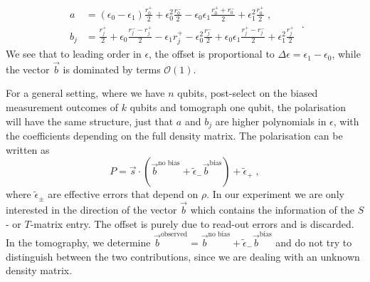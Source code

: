 \documentclass[a4paper,twocolumn,11pt]{quantumarticle}
\begin{document}
\begin{equation}
\begin{aligned}
	a&=(\epsilon_0-\epsilon_1) \frac{r^+_0}{2} +\epsilon_0^2 \frac{r^-_0}{2} -\epsilon_0 \epsilon_1 \frac{r^+_0+r^-_0}{2} +\epsilon_1^2 \frac{r_0^+}{2}\;,\\
	b_j&=\frac{r^+_j}{2}+ \epsilon_0 \frac{r^-_j-r^+_j}{2} -\epsilon_1 r^+_j -\epsilon_0^2 \frac{r^-_j}{2} +\epsilon_0 \epsilon_1 \frac{r^+_j-r^-_j}{2} + \epsilon_1^2 \frac{r_j^+}{2}
	\end{aligned}\;.
\end{equation}
We see that to leading order in $\epsilon$, the offset is proportional to $\Delta \epsilon=\epsilon_1-\epsilon_0$, while the vector $\vec b$ is dominated by terms $\mathcal O(1)$.

For a general setting, where we have $n$ qubits, post-select on the biased measurement outcomes of $k$ qubits and tomograph one qubit, the polarisation will have the same structure, just that $a$ and $b_j$ are higher polynomials in $\epsilon$, with the coefficients depending on the full density matrix. The polarisation can be written as 
\begin{equation}
	P=\vec s \cdot (\vec b^\text{no bias} + \tilde{\epsilon}_- \vec b^\text{bias}) + \tilde \epsilon_+ \;,
\end{equation}
where $\tilde \epsilon_\pm$ are effective errors that depend on $\rho$. In our experiment we are only interested in the direction of the vector $\vec b$ which contains the information of the $S$- or $T$-matrix entry. The offset is purely due to read-out errors and is discarded. In the tomography, we determine $\vec b^\text{observed}=\vec b^\text{no bias} + \tilde{\epsilon}_- \vec b^\text{bias}$ and do not try to distinguish between the two contributions, since we are dealing with an unknown density matrix. 




\end{document}

